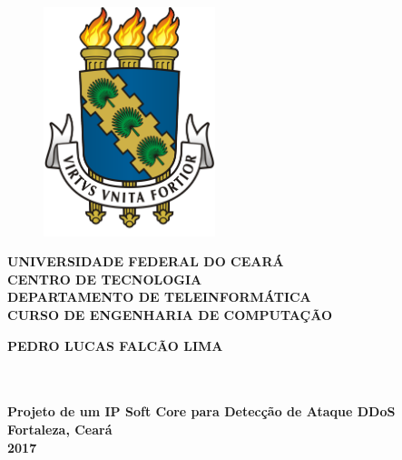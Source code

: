 \thispagestyle{empty}

\vfill
 \begin{center}
    \begin{figure}[t]
     \centering
            \includegraphics[width=5cm]{figures/UFC_logo_sem_t_tulo.png}\\[-0.1in]
     \end{figure}

    {\large\bfseries UNIVERSIDADE FEDERAL DO CEARÁ} \\
    {\large\bfseries CENTRO DE TECNOLOGIA} \\
    {\large\bfseries DEPARTAMENTO DE TELEINFORMÁTICA}  \\ 
    {\large\bfseries CURSO DE ENGENHARIA DE COMPUTAÇÃO}  \\ 

    \vspace*{1in}
    \begin{large} \bfseries PEDRO LUCAS FALCÃO LIMA \end{large}\\[0.4in]

    \vspace*{4cm}
    \noindent \\
    \large\bfseries{Projeto de um IP Soft Core para Detecção de Ataque DDoS} \\
    \vfill
    \large\bfseries{ Fortaleza, Ceará \\ 2017}
\end{center}

\normalsize